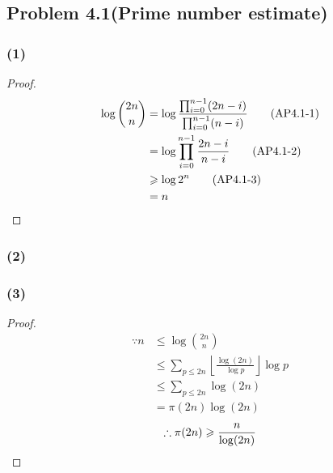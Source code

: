 \documentclass{article}
\begin{document}
	\subsection*{Problem 4.1(Prime number estimate)}
		\subsubsection*{(1)}
		\begin{proof}
			\begin{align*}
				\log \binom{2n}{n}
				&= \log \frac{\prod_{i=0}^{n-1}(2n - i)}{\prod_{i=0}^{n-1}(n - i)} \tag{AP4.1-1} \\
				&= \log \prod_{i=0}^{n-1} \frac{2n - i}{n - i} \tag{AP4.1-2} \\
				&\geqslant \log 2^n \tag{AP4.1-3} \\
				&= n \qedhere
			\end{align*}
		\end{proof}

		\subsubsection*{(2)}
		
		\subsubsection*{(3)}
		\begin{proof}
			\begin{align*}
				\because n
				&\leqslant \log \binom{2n}{n} \tag{AP4.1-4} \\
				&\leqslant \sum_{p \leqslant 2n} \left\lfloor \frac{\log(2n)}{\log p} \right\rfloor \log p \tag{AP4.1-5} \\
				&\leqslant \sum_{p \leqslant 2n} \log(2n) \tag{AP4.1-6} \\
				&= \pi (2n) \log (2n) \tag{AP4.1-7}
			\end{align*}
			\[ \therefore \pi(2n) \geqslant \frac{n}{\log(2n)} \qedhere \]
		\end{proof}
\end{document}
